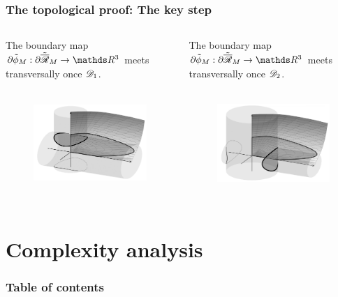 \documentclass{beamer}
\begin{document}
\begin{frame}
\frametitle{The topological proof: The key step}

\begin{columns}
\begin{column}{0.5\textwidth}
\begin{center}The boundary map $\partial\tilde{\phi}_M:\partial\tilde{\overline{\Rr}}_M\rightarrow\R^3$ meets transversally once $\mathscr{D}_1$.
\end{center}\begin{figure}[!ht]
\begin{center}
\includegraphics[height=4cm]{plots/ch3_02_B2.png}
\end{center}
\end{figure}
\end{column}
\begin{column}{0.5\textwidth}
\begin{center}The boundary map $\partial\tilde{\phi}_M:\partial\tilde{\overline{\Rr}}_M\rightarrow\R^3$ meets transversally once $\mathscr{D}_2$.
\end{center}\begin{figure}[!ht]
\begin{center}
\includegraphics[height=4cm]{plots/ch3_01_A2.png}
\end{center}
\end{figure}
\end{column}
\end{columns}

\end{frame}

\section{Complexity analysis}
\begin{frame}
\frametitle{Table of contents}
\tableofcontents[currentsection]
\end{frame} 
\end{document}
